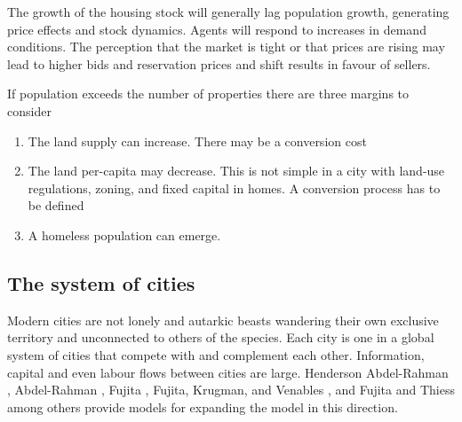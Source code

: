 The growth of the housing stock will generally lag population growth, generating price effects and stock dynamics.
Agents will respond to increases in demand conditions. The perception that the market is tight or that prices are rising may lead to higher bids and reservation prices and shift results in favour of sellers.  




If population exceeds the number of properties there are three margins to consider
	\begin{enumerate}
		\item The land supply can increase. There may be a conversion cost
		\item The land per-capita may decrease. This is not simple in a city with land-use regulations, zoning, and fixed capital in homes. A conversion process has to be defined
		\item A homeless population can emerge. 
	\end{enumerate}



\subsection{The system of cities}
Modern cities are not lonely and autarkic  beasts wandering their own exclusive territory and unconnected to others of the species. Each city is one in a global system of cities that compete with and complement each other. Information, capital and even labour flows between cities are large. Henderson Abdel-Rahman \cite{Henderson1972Sizes}, Abdel-Rahman \cite{abdel-rahmanAgglomerationEconomiesTypes1990}, Fujita \cite{fujitaMonopolisticCompetitionModel1988}, Fujita, Krugman, and Venables \cite{fujitaSpatialEconomyCities1999}, and Fujita and Thiess \cite{fujitaEconomicsAgglomeration1996} among others provide models for expanding the model in this direction.




